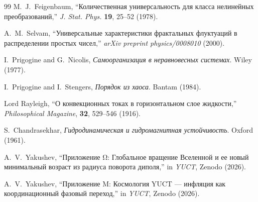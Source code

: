 \documentclass[11pt,a4paper]{article}
\begin{document}
\begin{thebibliography}{99}
		M.~J.~Feigenbaum, ``Количественная универсальность для класса нелинейных преобразований,'' \emph{J. Stat. Phys.} \textbf{19}, 25--52 (1978).
		
		A.~M.~Selvam, ``Универсальные характеристики фрактальных флуктуаций в распределении простых чисел,'' \emph{arXiv preprint physics/0008010} (2000).
		
		I.~Prigogine and G.~Nicolis, \emph{Самоорганизация в неравновесных системах}. Wiley (1977).
		
		I.~Prigogine and I.~Stengers, \emph{Порядок из хаоса}. Bantam (1984).
		
		Lord Rayleigh, ``О конвекционных токах в горизонтальном слое жидкости,'' \emph{Philosophical Magazine}, \textbf{32}, 529--546 (1916).
		
		S.~Chandrasekhar, \emph{Гидродинамическая и гидромагнитная устойчивость}. Oxford (1961).
		
		A.~V.~Yakushev, ``Приложение Ω: Глобальное вращение Вселенной и ее новый минимальный возраст из радиуса поворота диполя,'' in \emph{YUCT}, Zenodo (2026).
		
		A.~V.~Yakushev, ``Приложение M: Космология YUCT — инфляция как координационный фазовый переход,'' in \emph{YUCT}, Zenodo (2026).
		
	\end{thebibliography}
	
\end{document}
